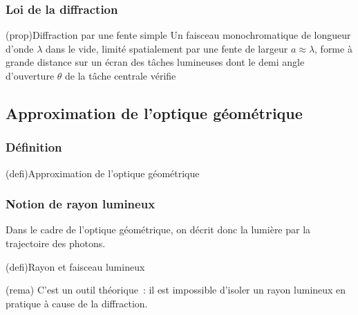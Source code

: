 \documentclass[../../main/main.tex]{subfiles}
\begin{document}
\subsubsection{Loi de la diffraction}

\begin{tcb*}[label=prop:loidiff](prop){Diffraction par une fente simple}
	Un faisceau monochromatique de longueur d'onde $\lambda$ dans le vide,
	limité spatialement par une fente de largeur $a \approx \lambda$, forme à
	grande distance sur un écran des tâches lumineuses dont le demi angle
	d'ouverture $\theta$ de la tâche centrale vérifie
	\psw{%
		\[
			\boxed{\sin(\theta) = \frac{\lambda}{a}}
		\]
	}%
	\vspace*{-10pt}
\end{tcb*}

\subsection{Approximation de l'optique géométrique}

\subsubsection{Définition}

\begin{tcb*}[label=def:optgeo,
  list entry={\lte Approxima$^\circ$ de l'optiq.\ géométrique}
  ](defi){Approximation de l'optique géométrique}
\end{tcb*}

\subsubsection{Notion de rayon lumineux}

Dans le cadre de l'optique géométrique, on décrit donc la lumière par la
trajectoire des photons.

\begin{tcb*}[cnt, bld, label=def:rl](defi){Rayon et faisceau lumineux}
\end{tcb*}
\begin{tcb}(rema){}
	C'est un outil théorique~: il est impossible d'isoler un rayon lumineux
	en pratique à cause de la diffraction.
\end{tcb}
\end{document}
